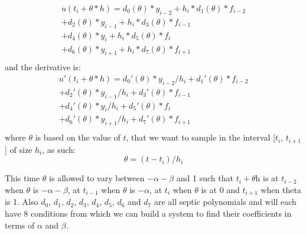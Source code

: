 \documentclass{article}
\begin{document}
\begin{equation}
\begin{split}
u(t_i + \theta*h) = d_{0}(\theta)*y_{i-2} +  h_i*d_{1}(\theta)*f_{i-2} \\
+ d_{2}(\theta)*y_{i-1}     +  h_i*d_{3}(\theta)*f_{i-1} \\
+ d_{4}(\theta)*y_i     +  h_i*d_{5}(\theta)*f_i \\
+ d_{6}(\theta)*y_{i + 1} + h_i*d_{7}(\theta)*f_{i + 1} \\
\end{split}
\end{equation}
and the derivative is:
\begin{equation}
\begin{split}
u'(t_i + \theta*h) = d_{0}'(\theta)*y_{i-2}/h_i +  d_{1}'(\theta)*f_{i-2} \\
+ d_{2}'(\theta)*y_{i-1}/h_i   +  d_{3}'(\theta)*f_{i-1} \\
+ d_{4}'(\theta)*y_i/h_i       +  d_{5}'(\theta)*f_i \\
+ d_{6}'(\theta)*y_{i + 1}/h_i +  d_{7}'(\theta)*f_{i + 1} \\
\end{split}
\end{equation}
where $\theta$ is based on the value of $t$, that we want to sample in the interval [$t_i$, $t_{i + 1}$] of size $h_i$, as such:
\begin{equation}
\theta = (t - t_i) / h_i
\end{equation}

This time $\theta$ is allowed to vary between $-\alpha-\beta$ and 1 such that $t_i + \theta$h is at $t_{i-2}$ when $\theta$ is $-\alpha-\beta$, at $t_{i-1}$ when $\theta$ is $-\alpha$, at $t_i$ when $\theta$ is at 0 and $t_{i + 1}$ when theta is 1. Also $d_0$, $d_1$, $d_2$, $d_3$, $d_4$, $d_5$, $d_6$ and $d_7$ are all septic polynomials and will each have 8 conditions from which we can build a system to find their coefficients in terms of $\alpha$ and $\beta$.
\end{document}

